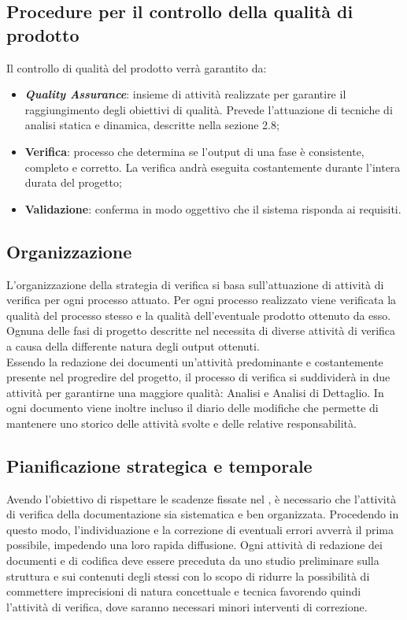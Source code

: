 \subsection{Procedure per il controllo della qualità di prodotto}
Il controllo di qualità del prodotto verrà garantito da:
\begin{itemize}
\item \textbf{\textit{Quality Assurance}}: insieme di attività realizzate per garantire il raggiungimento degli obiettivi di qualità. Prevede l'attuazione di tecniche di analisi statica e dinamica, descritte nella sezione 2.8;
\item \textbf{Verifica}: processo che determina se l'output di una fase è consistente, completo e corretto. La verifica andrà eseguita costantemente durante l'intera durata del progetto;
\item \textbf{Validazione}: conferma in modo oggettivo che il sistema risponda ai requisiti.
\end{itemize}

\subsection{Organizzazione}
L'organizzazione della strategia di verifica si basa sull'attuazione di attività di verifica per ogni processo attuato. Per ogni processo realizzato viene verificata la qualità del processo stesso e la qualità dell'eventuale prodotto ottenuto da esso.\\
Ognuna delle fasi di progetto descritte nel \textit{\PdP} necessita di diverse attività di verifica a causa della differente natura degli output ottenuti.\\
Essendo la redazione dei documenti un'attività predominante e costantemente presente nel progredire del progetto, il processo di verifica si suddividerà in due attività per garantirne una maggiore qualità: Analisi e Analisi di Dettaglio. In ogni documento viene inoltre incluso il diario delle modifiche che permette di mantenere uno storico delle attività svolte e delle relative responsabilità.

\subsection{Pianificazione strategica e temporale}
Avendo l'obiettivo di rispettare le scadenze fissate nel \textit{\PdP}, è necessario che l'attività di verifica della documentazione sia sistematica e ben organizzata. Procedendo in questo modo, l'individuazione e la correzione di eventuali errori avverrà il prima possibile, impedendo una loro rapida diffusione. Ogni attività di redazione dei documenti e di codifica deve essere preceduta da uno studio preliminare sulla struttura e sui contenuti degli stessi con lo scopo di ridurre la possibilità di commettere imprecisioni di natura concettuale e tecnica favorendo quindi l'attività di verifica, dove saranno necessari minori interventi di correzione.

